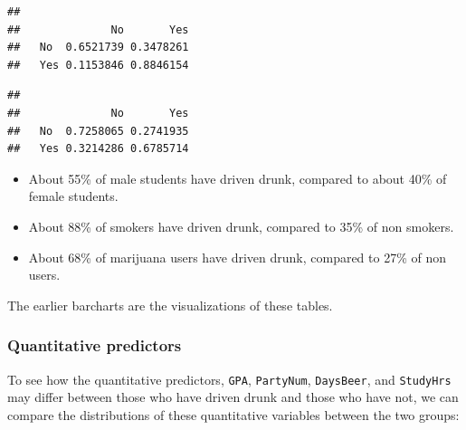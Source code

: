 \documentclass[
]{book}
\newenvironment{Shaded}{\begin{snugshade}}{\end{snugshade}}
\newcommand{\DecValTok}[1]{\textcolor[rgb]{0.00,0.00,0.81}{#1}}
\newcommand{\FunctionTok}[1]{\textcolor[rgb]{0.13,0.29,0.53}{\textbf{#1}}}
\newcommand{\NormalTok}[1]{#1}
\newcommand{\SpecialCharTok}[1]{\textcolor[rgb]{0.81,0.36,0.00}{\textbf{#1}}}
\providecommand{\tightlist}{%
  \setlength{\itemsep}{0pt}\setlength{\parskip}{0pt}}
\begin{document}
\begin{verbatim}
##      
##              No       Yes
##   No  0.6521739 0.3478261
##   Yes 0.1153846 0.8846154
\end{verbatim}

\begin{Shaded}
\end{Shaded}

\begin{verbatim}
##      
##              No       Yes
##   No  0.7258065 0.2741935
##   Yes 0.3214286 0.6785714
\end{verbatim}

\begin{itemize}
\tightlist
\item
  About 55\% of male students have driven drunk, compared to about 40\% of female students.
\item
  About 88\% of smokers have driven drunk, compared to 35\% of non smokers.
\item
  About 68\% of marijuana users have driven drunk, compared to 27\% of non users.
\end{itemize}

The earlier barcharts are the visualizations of these tables.

\hypertarget{quantitative-predictors}{%
\subsubsection*{Quantitative predictors}\label{quantitative-predictors}}

To see how the quantitative predictors, \texttt{GPA}, \texttt{PartyNum}, \texttt{DaysBeer}, and \texttt{StudyHrs} may differ between those who have driven drunk and those who have not, we can compare the distributions of these quantitative variables between the two groups:
\end{document}

